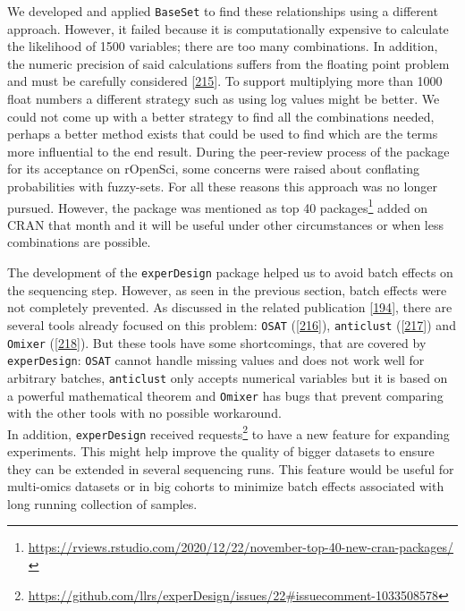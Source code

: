 \documentclass[
  12pt,
  a4paper,
  twoside,
  openright]{book}
\DeclareRobustCommand{\href}[2]{#2\footnote{\url{#1}}}
\begin{document}
We developed and applied \texttt{BaseSet} to find these relationships using a different approach.
However, it failed because it is computationally expensive to calculate the likelihood of 1500 variables; there are too many combinations.
In addition, the numeric precision of said calculations suffers from the floating point problem and must be carefully considered {[}\protect\hyperlink{ref-goldberg1991}{215}{]}.
To support multiplying more than 1000 float numbers a different strategy such as using log values might be better.
We could not come up with a better strategy to find all the combinations needed, perhaps a better method exists that could be used to find which are the terms more influential to the end result.
During the peer-review process of the package for its acceptance on rOpenSci, some concerns were raised about conflating probabilities with fuzzy-sets.
For all these reasons this approach was no longer pursued.
However, the package was mentioned as \href{https://rviews.rstudio.com/2020/12/22/november-top-40-new-cran-packages/}{top 40 packages} added on CRAN that month and it will be useful under other circumstances or when less combinations are possible.

The development of the \texttt{experDesign} package helped us to avoid batch effects on the sequencing step.
However, as seen in the previous section, batch effects were not completely prevented.
As discussed in the related publication {[}\protect\hyperlink{ref-revillasancho2021}{194}{]}, there are several tools already focused on this problem: \texttt{OSAT} ({[}\protect\hyperlink{ref-yan2012}{216}{]}), \texttt{anticlust} ({[}\protect\hyperlink{ref-papenberg2020}{217}{]}) and \texttt{Omixer} ({[}\protect\hyperlink{ref-sinke2021}{218}{]}).
But these tools have some shortcomings, that are covered by \texttt{experDesign}: \texttt{OSAT} cannot handle missing values and does not work well for arbitrary batches, \texttt{anticlust} only accepts numerical variables but it is based on a powerful mathematical theorem and \texttt{Omixer} has bugs that prevent comparing with the other tools with no possible workaround.\\
In addition, \texttt{experDesign} received \href{https://github.com/llrs/experDesign/issues/22\#issuecomment-1033508578}{requests} to have a new feature for expanding experiments.
This might help improve the quality of bigger datasets to ensure they can be extended in several sequencing runs.
This feature would be useful for multi-omics datasets or in big cohorts to minimize batch effects associated with long running collection of samples.
\end{document}
